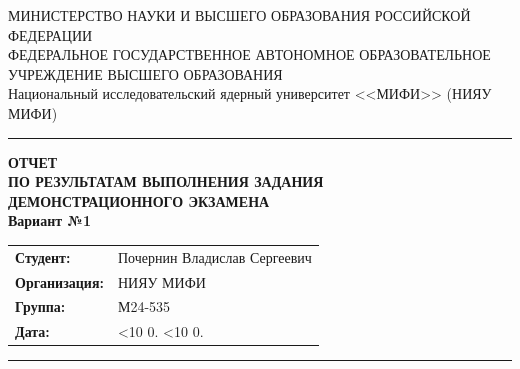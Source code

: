 \documentclass[a4paper, 14pt]{article}
\newcommand{\rusdate}{%
  \ifnum\day<10 0\fi\number\day.%
  \ifnum\month<10 0\fi\number\month.%
  \number\year}
\begin{document}

\begin{titlepage}
\begin{center}
МИНИСТЕРСТВО НАУКИ И ВЫСШЕГО ОБРАЗОВАНИЯ РОССИЙСКОЙ ФЕДЕРАЦИИ\\
ФЕДЕРАЛЬНОЕ ГОСУДАРСТВЕННОЕ АВТОНОМНОЕ ОБРАЗОВАТЕЛЬНОЕ УЧРЕЖДЕНИЕ ВЫСШЕГО ОБРАЗОВАНИЯ\\
Национальный исследовательский ядерный университет <<МИФИ>> (НИЯУ МИФИ)\\
\noindent\rule{500pt}{0.8pt}

\vfill

{\LARGE \bfseries
ОТЧЕТ\\[1pt]
ПО РЕЗУЛЬТАТАМ ВЫПОЛНЕНИЯ ЗАДАНИЯ\\[1pt]
ДЕМОНСТРАЦИОННОГО ЭКЗАМЕНА\\[7pt]
\mdseries Вариант №1
}

\vfill

\large
\renewcommand{\arraystretch}{2}
\begin{tabular}{>{\raggedleft\arraybackslash}p{6cm} p{8.7cm}}
\textbf{Студент:}    & Почернин Владислав Сергеевич \\
\textbf{Организация:}      & НИЯУ МИФИ \\
\textbf{Группа:}           & М24-535 \\
\textbf{Дата:}             & \rusdate \\
\end{tabular}

\vfill

\noindent\rule{500pt}{0.8pt} \\

\vspace{0.3cm}


\end{center}
\end{titlepage}
\end{document}
